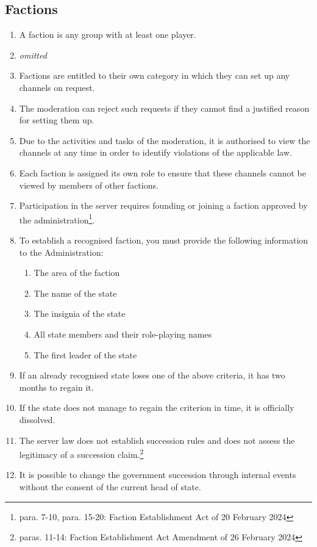 \documentclass{article}
\begin{document}
\subsection{Factions}
\begin{enumerate}[(1)]
	\item A faction is any group with at least one player.
	\item \textit{omitted}
	\item Factions are entitled to their own category in which they can set up any channels on request.
	\item The moderation can reject such requests if they cannot find a justified reason for setting them up.
	\item Due to the activities and tasks of the moderation, it is authorised to view the channels at any time in order to identify violations of the applicable law.
	\item Each faction is assigned its own role to ensure that these channels cannot be viewed by members of other factions.
    \item Participation in the server requires founding or joining a faction approved by the administration\footnote{para. 7-10, para. 15-20: Faction Establishment Act of 20 February 2024}.
    \item To establish a recognised faction, you must provide the following information to the Administration:
    \begin{enumerate}[1.]
        \item The area of the faction
        \item The name of the state
        \item The insignia of the state
        \item All state members and their role-playing names
        \item The first leader of the state
    \end{enumerate}
	\item If an already recognised state loses one of the above criteria, it has two months to regain it.
    \item If the state does not manage to regain the criterion in time, it is officially dissolved.
	\item The server law does not establish succession rules and does not assess the legitimacy of a succession claim.\footnote{paras. 11-14: Faction Establishment Act Amendment of 26 February 2024}
	\item It is possible to change the government succession through internal events without the consent of the current head of state.

\end{enumerate}
\end{document}
